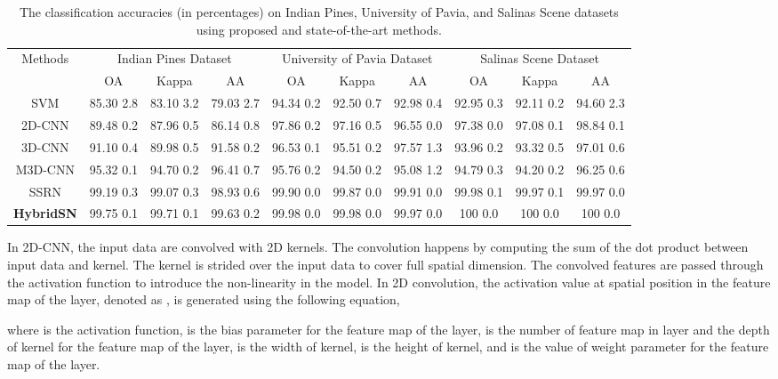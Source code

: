 \documentclass[journal]{IEEEtran}
\begin{document}
\begin{table*}[!t]
\caption{The classification accuracies (in percentages) on Indian Pines, University of Pavia, and Salinas Scene datasets using proposed and state-of-the-art methods.}
\centering
\begin{tabular}{c|ccc|ccc|ccc}
\toprule
\multirow{2}{*}{Methods} & \multicolumn{3}{c|}{Indian Pines Dataset} & \multicolumn{3}{c|}{University of Pavia Dataset} & \multicolumn{3}{c}{Salinas Scene Dataset}\\
\cline{2-10}
 & OA & Kappa & AA & OA & Kappa & AA & OA & Kappa & AA \\ 
\midrule
SVM & 85.30  2.8 & 83.10  3.2 & 79.03  2.7 & 94.34  0.2 & 92.50  0.7 & 92.98  0.4 & 92.95  0.3 & 92.11  0.2 & 94.60  2.3\\
2D-CNN & 89.48  0.2 & 87.96  0.5 & 86.14  0.8 & 97.86  0.2 & 97.16  0.5 & 96.55  0.0 & 97.38  0.0 & 97.08  0.1 & 98.84  0.1\\
3D-CNN & 91.10  0.4 & 89.98  0.5 & 91.58  0.2 & 96.53  0.1 & 95.51  0.2 & 97.57  1.3 & 93.96  0.2 & 93.32  0.5 & 97.01  0.6\\
M3D-CNN & 95.32  0.1 & 94.70  0.2 & 96.41  0.7 & 95.76  0.2 & 94.50  0.2 & 95.08  1.2 & 94.79  0.3 & 94.20  0.2 & 96.25  0.6\\
SSRN & 99.19  0.3 & 99.07  0.3 & 98.93  0.6 & 99.90  0.0 & 99.87  0.0 & 99.91  0.0 & 99.98  0.1 & 99.97  0.1 & 99.97  0.0\\
\textbf{HybridSN} & 99.75  0.1 & 99.71  0.1 & 99.63  0.2 & 99.98  0.0 & 99.98  0.0 & 99.97  0.0 & 100  0.0 & 100  0.0 & 100  0.0\\
\bottomrule
\end{tabular}
\label{tab:comp}
\end{table*}


In 2D-CNN, the input data are convolved with 2D kernels. The convolution happens by computing the sum of the dot product between input data and kernel. The kernel is strided over the input data to cover full spatial dimension. The convolved features are passed through the activation function to introduce the non-linearity in the model. In 2D convolution, the activation value at spatial position  in the  feature map of the  layer, denoted as , is generated using the following equation,
    
where  is the activation function,  is the bias parameter for the  feature map of the  layer,  is the number of feature map in  layer and the depth of kernel  for the  feature map of the  layer,  is the width of kernel,  is the height of kernel, and  is the value of weight parameter for the  feature map of the  layer.
\end{document}
